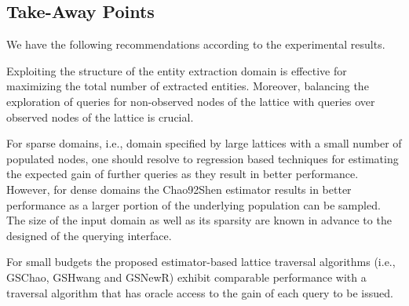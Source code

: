 \subsection{Take-Away Points}
We have the following recommendations according to the experimental results.
\squishlist
\item Exploiting the structure of the entity extraction domain is effective for maximizing the total number of extracted entities. Moreover, balancing the exploration of queries for non-observed nodes of the lattice with queries over observed nodes of the lattice is crucial.
\item For sparse domains, i.e., domain specified by large lattices with a small number of populated nodes, one should resolve to regression based techniques for estimating the expected gain of further queries as they result in better performance. However, for dense domains the Chao92Shen estimator results in better performance as a larger portion of the underlying population can be sampled. The size of the input domain as well as its sparsity are known in advance to the designed of the querying interface. 
\item For small budgets the proposed estimator-based lattice traversal algorithms (i.e., GSChao, GSHwang and GSNewR) exhibit comparable performance with a traversal algorithm that has oracle access to the gain of each query to be issued.
\squishend